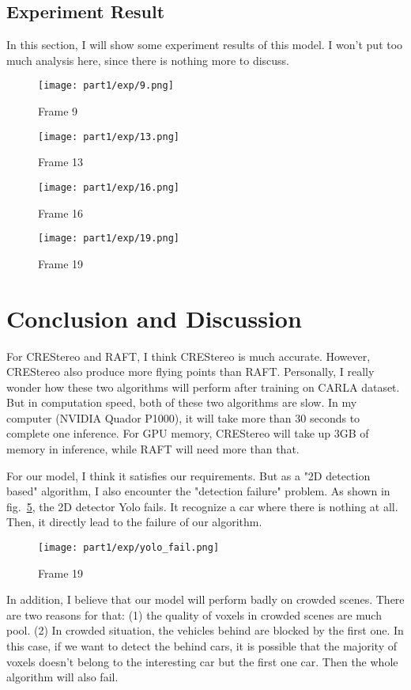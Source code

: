 \documentclass[12pt]{article}
\begin{document}
\subsection{Experiment Result}
In this section, I will show some experiment results of this model. I won't put too much analysis here, since there is nothing more to discuss.
\begin{figure}[H]
    \centering
    \texttt{[image: part1/exp/9.png]}
    \caption{Frame 9}
    \label{f9}
\end{figure}
\begin{figure}[H]
    \centering
    \texttt{[image: part1/exp/13.png]}
    \caption{Frame 13}
    \label{f13}
\end{figure}
\begin{figure}[H]
    \centering
    \texttt{[image: part1/exp/16.png]}
    \caption{Frame 16}
    \label{f16}
\end{figure}
\begin{figure}[H]
    \centering
    \texttt{[image: part1/exp/19.png]}
    \caption{Frame 19}
    \label{f19}
\end{figure}
\section{Conclusion and Discussion}
For CREStereo and RAFT, I think CREStereo is much accurate. However, CREStereo also produce more flying points than RAFT. Personally, I really wonder how these two algorithms will perform after training on CARLA dataset. But in computation speed, both of these two algorithms are slow. In my computer (NVIDIA Quador P1000), it will take more than 30 seconds to complete one inference. For GPU memory, CREStereo will take up 3GB of memory in inference, while RAFT will need more than that.

For our model, I think it satisfies our requirements. But as a "2D detection based" algorithm, I also encounter the "detection failure" problem. As shown in fig.~\ref{yolo_fail}, the 2D detector Yolo fails. It recognize a car where there is nothing at all. Then, it directly lead to the failure of our algorithm.
\begin{figure}[H]
    \centering
    \texttt{[image: part1/exp/yolo\_fail.png]}
    \caption{Frame 19}
    \label{yolo_fail}
\end{figure}
In addition, I believe that our model will perform badly on crowded scenes. There are two reasons for that: (1) the quality of voxels in crowded scenes are much pool. (2) In crowded situation, the vehicles behind are blocked by the first one. In this case, if we want to detect the behind cars, it is possible that the majority of voxels doesn't belong to the interesting car but the first one car. Then the whole algorithm will also fail.
\end{document}
